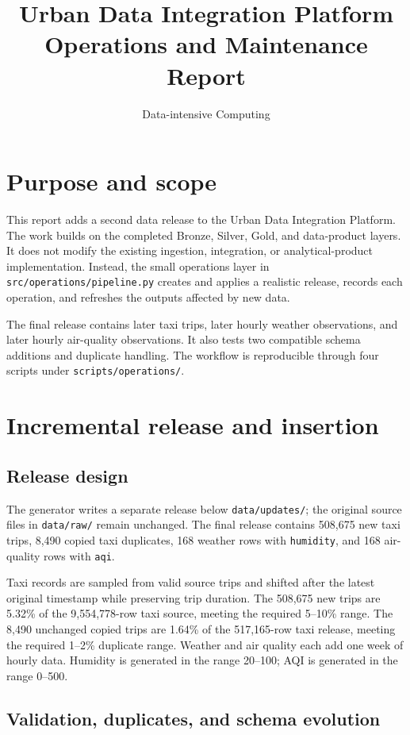 \documentclass[11pt]{article}
\title{Urban Data Integration Platform\\Operations and Maintenance Report}
\author{Data-intensive Computing}
\date{}
\begin{document}
\maketitle

\section{Purpose and scope}

This report adds a second data release to the Urban Data Integration Platform.
The work builds on the completed Bronze, Silver, Gold, and data-product layers.
It does not modify the existing ingestion, integration, or analytical-product
implementation. Instead, the small operations layer in
\texttt{src/operations/pipeline.py} creates and applies a realistic release,
records each operation, and refreshes the outputs affected by new data.

The final release contains later taxi trips, later hourly weather observations,
and later hourly air-quality observations. It also tests two compatible schema
additions and duplicate handling. The workflow is reproducible through four
scripts under \texttt{scripts/operations/}.

\section{Incremental release and insertion}

\subsection{Release design}

The generator writes a separate release below \texttt{data/updates/}; the
original source files in \texttt{data/raw/} remain unchanged. The final release contains 508,675 new taxi trips, 8,490 copied taxi duplicates, 168 weather rows with \texttt{humidity}, and 168 air-quality rows with \texttt{aqi}.


Taxi records are sampled from valid source trips and shifted after the latest
original timestamp while preserving trip duration. The 508,675 new trips are
5.32\% of the 9,554,778-row taxi source, meeting the required 5--10\% range.
The 8,490 unchanged copied trips are 1.64\% of the 517,165-row taxi release,
meeting the required 1--2\% duplicate range. Weather and air quality each add
one week of hourly data. Humidity is generated in the range 20--100; AQI is
generated in the range 0--500.

\subsection{Validation, duplicates, and schema evolution}
\end{document}
